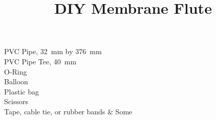 \documentclass{article}
\title{DIY Membrane Flute}
\begin{document}
\begin{equipment}
    PVC Pipe, \SI{32}{\milli\meter} by \SI{376}{\milli\meter} \\
    PVC Pipe Tee, \SI{40}{\milli\meter} \\
    O-Ring \\
    Balloon \\
    Plastic bag \\
    Scissors \\
    Tape, cable tie, or rubber bands & Some 
\end{equipment}    
\end{document}
